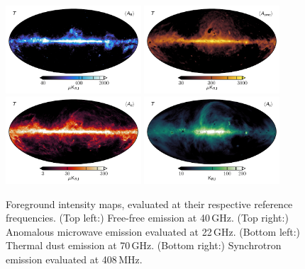 \documentclass[twocolumn]{../../common/aa}
\begin{document}
\begin{figure}
	\centering
	\includegraphics[width=0.45\textwidth]{figures/ff_I.pdf}
	\includegraphics[width=0.45\textwidth]{figures/ame_I.pdf}\\
	\includegraphics[width=0.45\textwidth]{figures/dust_I.pdf}
	\includegraphics[width=0.45\textwidth]{figures/synch_I.pdf}\\
	\caption{Foreground intensity maps, evaluated at their respective reference frequencies. (Top left:) Free-free emission at 40\,GHz. (Top right:) Anomalous microwave emission evaluated at 22\,GHz. (Bottom left:) Thermal dust emission at 70\,GHz. (Bottom right:) Synchrotron emission evaluated at 408\,MHz.}\label{fig:intensity_foregrounds}
\end{figure}
\end{document}

